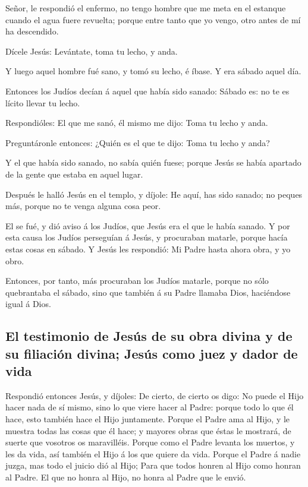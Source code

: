  Señor, le respondió el enfermo, no tengo hombre que me meta
en el estanque cuando el agua fuere revuelta; porque entre tanto que yo
vengo, otro antes de mí ha descendido.

 Dícele Jesús: Levántate, toma tu lecho, y anda.

 Y luego aquel hombre fué sano, y tomó su lecho, é íbase. Y
era sábado aquel día.

 Entonces los Judíos decían á aquel que había sido sanado:
Sábado es: no te es lícito llevar tu lecho.

 Respondióles: El que me sanó, él mismo me dijo: Toma tu
lecho y anda.

 Preguntáronle entonces: ¿Quién es el que te dijo: Toma tu
lecho y anda?

 Y el que había sido sanado, no sabía quién fuese; porque
Jesús se había apartado de la gente que estaba en aquel lugar.

 Después le halló Jesús en el templo, y díjole: He aquí,
has sido sanado; no peques más, porque no te venga alguna cosa peor.

 El se fué, y dió aviso á los Judíos, que Jesús era el que
le había sanado.  Y por esta causa los Judíos perseguían á
Jesús, y procuraban matarle, porque hacía estas cosas en sábado.
 Y Jesús les respondió: Mi Padre hasta ahora obra, y yo
obro.

 Entonces, por tanto, más procuraban los Judíos matarle,
porque no sólo quebrantaba el sábado, sino que también á su Padre
llamaba Dios, haciéndose igual á Dios.

\hypertarget{el-testimonio-de-jesuxfas-de-su-obra-divina-y-de-su-filiaciuxf3n-divina-jesuxfas-como-juez-y-dador-de-vida}{%
\subsection{El testimonio de Jesús de su obra divina y de su filiación
divina; Jesús como juez y dador de
vida}\label{el-testimonio-de-jesuxfas-de-su-obra-divina-y-de-su-filiaciuxf3n-divina-jesuxfas-como-juez-y-dador-de-vida}}

 Respondió entonces Jesús, y díjoles: De cierto, de cierto
os digo: No puede el Hijo hacer nada de sí mismo, sino lo que viere
hacer al Padre: porque todo lo que él hace, esto también hace el Hijo
juntamente.  Porque el Padre ama al Hijo, y le muestra
todas las cosas que él hace; y mayores obras que éstas le mostrará, de
suerte que vosotros os maravilléis.  Porque como el Padre
levanta los muertos, y les da vida, así también el Hijo á los que quiere
da vida.  Porque el Padre á nadie juzga, mas todo el juicio
dió al Hijo;  Para que todos honren al Hijo como honran al
Padre. El que no honra al Hijo, no honra al Padre que le envió.

